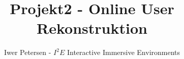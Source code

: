 \documentclass{lni}
\author{Iwer Petersen - $I^2E$ Interactive Immersive Environments}
\title{Projekt2 - Online User Rekonstruktion}
\begin{document}
\maketitle
\renewcommand{\refname}{Literaturverzeichnis}
\setcounter{footnote}{1} %

%





\end{document}
